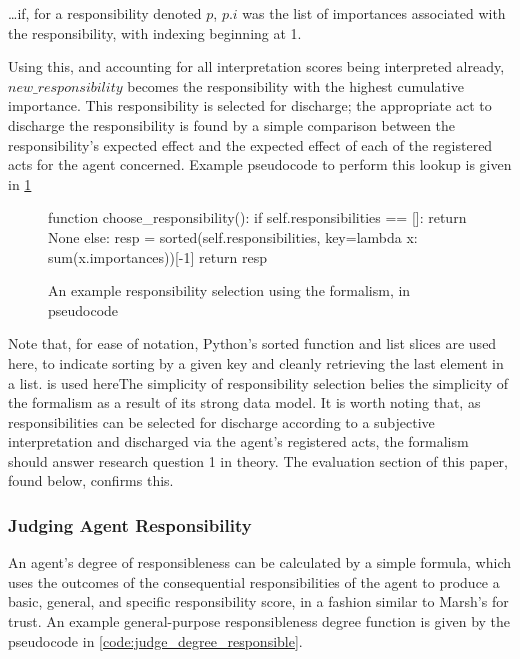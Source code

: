 \ldots{}if, for a responsibility denoted \(p\), \(p.i\) was the list of importances associated with the responsibility, with indexing beginning at 1.\par

Using this, and accounting for all interpretation scores being interpreted already, \(new\_responsibility\) becomes the responsibility with the highest cumulative importance. This responsibility is selected for discharge; the appropriate act to discharge the responsibility is found by a simple comparison between the responsibility's expected effect and the expected effect of each of the registered acts for the agent concerned. Example pseudocode to perform this lookup is given in \cref{code:responsibility_selection}

\begin{figure}[h]
    \centering
    \begin{pseudocodelisting}
    function choose_responsibility():
        if self.responsibilities == []:
            return None
        else:
            resp = sorted(self.responsibilities,
                          key=lambda x: sum(x.importances))[-1]
            return resp
    \end{pseudocodelisting}
    \caption{An example responsibility selection using the formalism, in pseudocode}
    \label{code:responsibility_selection}
\end{figure}

Note that, for ease of notation, Python's sorted function and list slices are used here, to indicate sorting by a given key and cleanly retrieving the last element in a list. is used hereThe simplicity of responsibility selection belies the simplicity of the formalism as a result of its strong data model. It is worth noting that, as responsibilities can be selected for discharge according to a subjective interpretation and discharged via the agent's registered acts, the formalism should answer research question 1 in theory. The evaluation section of this paper, found below, confirms this.\par

\subsubsection{Judging Agent Responsibility}  %
An agent's degree of responsibleness can be calculated by a simple formula, which uses the outcomes of the consequential responsibilities of the agent to produce a basic, general, and specific responsibility score, in a fashion similar to Marsh's for trust\cite{Marsh1994FormalisingConcept}. An example general-purpose responsibleness degree function is given by the pseudocode in \cref{code:judge_degree_responsible}.\par

